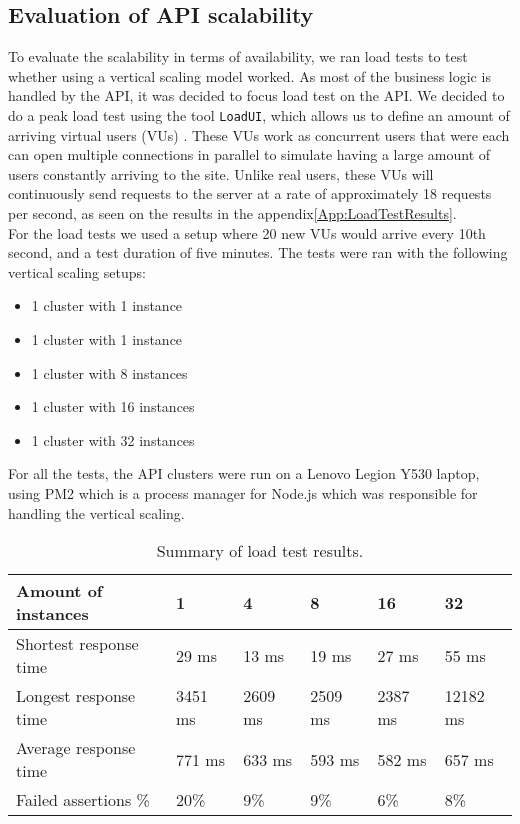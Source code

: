 \subsection{Evaluation of API scalability}
To evaluate the scalability in terms of availability, we ran load tests to test whether using a vertical scaling model worked.
As most of the business logic is handled by the API, it was decided to focus load test on the API.
We decided to do a peak load test using the tool \texttt{LoadUI}, which allows us to define an amount of arriving virtual users (VUs) \cite{loadimpactSource}. 
These VUs work as concurrent users that were each can open multiple connections in parallel to simulate having a large amount of users constantly arriving to the site.
Unlike real users, these VUs will continuously send requests to the server at a rate of approximately 18 requests per second, as seen on the results in the appendix\autoref{App:LoadTestResults}.
\\
For the load tests we used a setup where 20 new VUs would arrive every 10th second, and a test duration of five minutes.
The tests were ran with the following vertical scaling setups:
\begin{itemize}
    \item 1 cluster with 1 instance
    \item 1 cluster with 1 instance
    \item 1 cluster with 8 instances
    \item 1 cluster with 16 instances
    \item 1 cluster with 32 instances
\end{itemize}
For all the tests, the API clusters were run on a Lenovo Legion Y530 laptop, using PM2 which is a process manager for Node.js which was responsible for handling the vertical scaling\cite{PM2}.

\begin{table}[]
    \begin{tabular}{|l|l|l|l|l|l|}
    \hline
    \textbf{Amount of instances} & \textbf{1} & \textbf{4} & \textbf{8} & \textbf{16} & \textbf{32} \\ \hline
    Shortest response time       & 29 ms      & 13 ms      & 19 ms      & 27 ms       & 55 ms       \\ \hline
    Longest response time        & 3451 ms    & 2609 ms    & 2509 ms    & 2387 ms     & 12182 ms    \\ \hline
    Average response time        & 771 ms     & 633 ms     & 593 ms     & 582 ms      & 657 ms      \\ \hline
    Failed assertions \%         & 20\%       & 9\%        & 9\%        & 6\%         & 8\%         \\ \hline
    \end{tabular}
    \caption{Summary of load test results.}
    \label{table:load-test-table}
\end{table}

